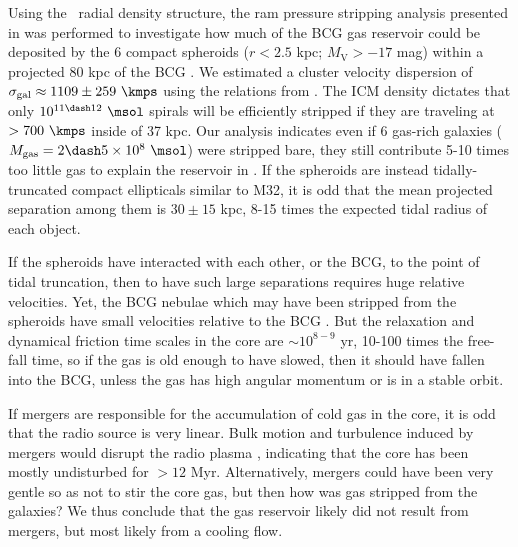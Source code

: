 \documentclass[useAMS,usenatbib]{mn2e}
\begin{document}
Using the \rxj\ radial density structure, the ram pressure stripping
analysis presented in \citet{a1664}
was performed to investigate how much of the BCG gas reservoir could
be deposited by the 6 compact spheroids ($r < 2.5$ kpc;
$M_{\mathrm{V}} > -17$ mag) within a projected 80 kpc of the BCG
\citep{1996AJ....111..649S, 1999Ap&SS.266..113A}. We estimated a
cluster velocity dispersion of $\sigma_{\mathrm{gal}} \approx 1109 \pm
259 ~\kmps$ using the relations from \citet{2000MNRAS.318..715X}. The
ICM density dictates that only $10^{11 \dash 12} ~\msol$ spirals will
be efficiently stripped if they are traveling at $> 700 ~\kmps$ inside
of 37 kpc. Our analysis indicates even if 6 gas-rich galaxies
($M_{\mathrm{gas}} = 2 \dash 5 \times 10^8 ~\msol$) were stripped
bare, they still contribute 5-10 times too little gas to explain the
reservoir in \irs.
If the spheroids are instead tidally-truncated compact ellipticals
similar to M32, it is odd that the mean projected separation among
them is $30 \pm 15$ kpc, 8-15 times the expected tidal radius of each
object.

If the spheroids have interacted with each other, or the BCG,
to the point of tidal truncation, then to have such large separations
requires huge relative velocities. Yet, the BCG nebulae which may have
been stripped from the spheroids have small velocities relative to the
BCG \citep{1996MNRAS.283.1003C}. But the relaxation and dynamical
friction time scales in the core are $\sim 10^{8-9}$ yr, 10-100 times
the free-fall time, so if the gas is old enough to have slowed, then
it should have fallen into the BCG, unless the gas has high angular
momentum or is in a stable orbit.

If mergers are responsible for the accumulation of cold gas in the
core, it is odd that the radio source is very linear. Bulk motion and
turbulence induced by mergers would disrupt the radio plasma
\citep[\eg][]{2009A&A...495..721S, 2010arXiv1002.0395S}, indicating
that the core has been mostly undisturbed for $> 12$
Myr. Alternatively, mergers could have been very gentle so as not to
stir the core gas, but then how was gas stripped from the galaxies?
We thus conclude that the gas reservoir likely did not result from
mergers, but most likely from a cooling flow.
\end{document}
